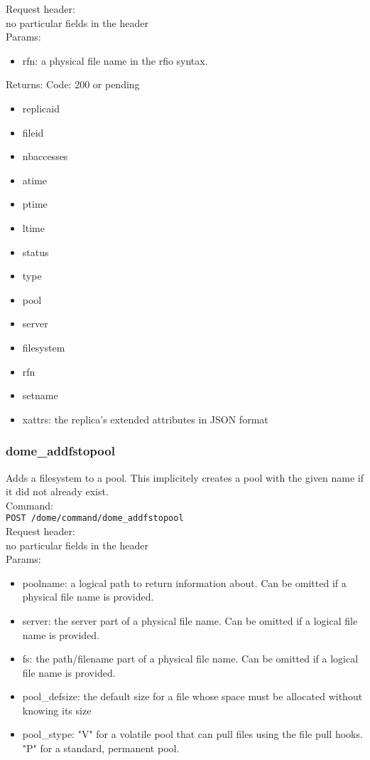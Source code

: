 \documentclass[a4paper,10pt]{scrreprt}
\begin{document}
Request header:\\
no particular fields in the header\\

Params:
\begin{itemize}
 \item rfn: a physical file name in the rfio syntax.
\end{itemize}

Returns:
Code: 200 or pending
\begin{itemize}

 \item replicaid
 \item fileid
 \item nbaccesses
 \item atime
 \item ptime
 \item ltime
 \item status
 \item type
 \item pool
 \item server
 \item filesystem
 \item rfn
 \item setname
 \item xattrs: the replica's extended attributes in JSON format
\end{itemize}



\subsubsection{dome\_addfstopool}
Adds a filesystem to a pool. This implicitely creates a pool with the given name if it did not already exist.\\

Command:\\
\lstinline"POST /dome/command/dome_addfstopool"\\

Request header:\\
no particular fields in the header\\

Params:
\begin{itemize}
 \item poolname: a logical path to return information about. Can be omitted if a physical file name is provided.
 \item server: the server part of a physical file name. Can be omitted if a logical file name is provided.
 \item fs: the path/filename part of a physical file name. Can be omitted if a logical file name is provided.
 \item pool\_defsize: the default size for a file whose space must be allocated without knowing its size
 \item pool\_stype: "V" for a volatile pool that can pull files using the file pull hooks. "P" for a standard, permanent pool.
\end{itemize}
\end{document}
